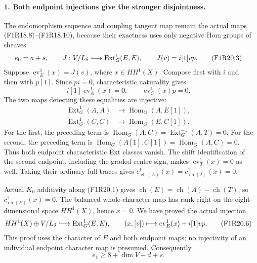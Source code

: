 \paragraph{1. Both endpoint injections give the stronger disjointness.}
The endomorphism sequence and coupling tangent map
remain the actual maps (F1R18.8)--(F1R18.10), because
their exactness uses only negative Hom groups of sheaves:
\[
 e_0=a+s,\qquad
 J:V/L_\delta\lhook\joinrel\longrightarrow
                       \operatorname{Ext}^1_G(E,E),\qquad
                       J(v)=i[1]vp.
 \tag{F1R20.3}
\]
Suppose $\operatorname{ev}_E^1(x)=J(v)$, where
$x\in HH^1(X)$. Compose first with $i$ and then with
$p[1]$. Since $pi=0$, characteristic naturality gives
\[
           i[1]\operatorname{ev}_A^1(x)=0,\qquad
                    \operatorname{ev}_C^1(x)p=0.
 \tag{F1R20.4}
\]
The two maps detecting these equalities are injective:
\[
 \begin{split}
 \operatorname{Ext}^1_G(A,A)&\longrightarrow
                              \operatorname{Hom}_G(A,E[1]),\\
 \operatorname{Ext}^1_G(C,C)&\longrightarrow
                              \operatorname{Hom}_G(E,C[1]).
 \end{split}
 \tag{F1R20.5}
\]
For the first, the preceding term is
$\operatorname{Hom}_G(A,C)=\operatorname{Ext}^{-1}_G(A,T)=0$.
For the second, the preceding term is
$\operatorname{Hom}_G(A[1],C[1])=\operatorname{Hom}_G(A,C)=0$.
Thus both endpoint characteristic Ext classes vanish.
The shift identification of the second endpoint,
including the graded-centre sign, makes
$\operatorname{ev}_T^1(x)=0$ as well. Taking their
ordinary full traces gives
$c^1_{\operatorname{ch}(A)}(x)=c^1_{\operatorname{ch}(T)}(x)=0$.

Actual $K_0$ additivity along (F1R20.1) gives
$\operatorname{ch}(E)=\operatorname{ch}(A)-\operatorname{ch}(T)$,
so $c^1_{\operatorname{ch}(E)}(x)=0$. The balanced
whole-character map has rank eight on the eight-dimensional
space $HH^1(X)$, hence $x=0$. We have proved the actual
injection
\[
 HH^1(X)\oplus V/L_\delta
       \lhook\joinrel\longrightarrow\operatorname{Ext}^1_G(E,E),
 \qquad(x,[v])\longmapsto\operatorname{ev}_E^1(x)+i[1]vp.
 \tag{F1R20.6}
\]
This proof uses the character of $E$ and both endpoint
maps; no injectivity of an individual endpoint character
map is presumed. Consequently
\[
                            e_1\ge8+\dim V-d+s.
 \tag{F1R20.7}
\]

